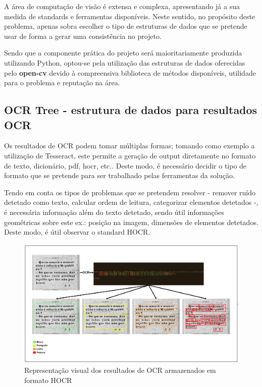A área de computação de visão é extensa e complexa, apresentando já a sua medida de standards e ferramentas disponíveis. Neste sentido, no propósito deste problema, apenas sobra escolher o tipo de estruturas de dados que se pretende usar de forma a gerar uma consistência no projeto.

Sendo que a componente prática do projeto será maioritariamente produzida utilizando Python, optou-se pela utilização das estruturas de dados oferecidas pelo \textbf{open-cv} devido à compreensiva biblioteca de métodos disponíveis, utilidade para o problema e reputação na área.

\subsection{OCR Tree - estrutura de dados para resultados OCR}

Os resultados de OCR podem tomar múltiplas formas; tomando como exemplo a utilização de Tesseract, este permite a geração de output diretamente no formato de texto, dicionário, pdf, hocr, etc.. Deste modo, é necessário decidir o tipo de formato que se pretende para ser trabalhado pelas ferramentas da solução.

Tendo em conta os tipos de problemas que se pretendem resolver - remover ruído detetado como texto, calcular ordem de leitura, categorizar elementos detetados -, é necessária informação além do texto detetado, sendo útil informações geométricas sobre este ex.: posição na imagem, dimensões de elementos detetados. Deste modo, é útil observar o standard HOCR.

\begin{figure}[H]
	\centering
	\includegraphics[width=1\textwidth]{images/ilustracoes/hocr_visual_representation.png}
	\caption{Representação visual dos resultados de OCR armazenados em formato HOCR}
	\label{fig:hocr_visual_representation}
\end{figure}


